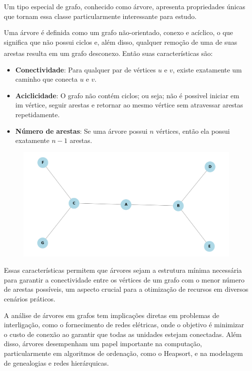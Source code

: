 \documentclass[12pt, a4paper]{scrreprt}
\begin{document}
Um tipo especial de grafo, conhecido como árvore, apresenta propriedades únicas que tornam essa classe particularmente interessante para estudo.

Uma árvore é definida como um grafo não-orientado, conexo e acíclico, o que significa que não possui ciclos e, além disso, qualquer remoção de uma de suas arestas resulta em um grafo desconexo.\textsuperscript{\cite{definicaoarvore} \cite{emilio2024arvores}} Então suas características são:

\begin{itemize}
        \item \textbf{Conectividade}: Para qualquer par de vértices \( u \) e \( v \), existe exatamente um caminho que conecta \( u \) e \( v \).
        \item \textbf{Aciclicidade}: O grafo não contém ciclos; ou seja; não é possivel iniciar em im vértice, seguir arestas e retornar ao mesmo vértice sem atravessar arestas repetidamente.
        \item \textbf{Número de arestas}: Se uma árvore possui \( n \) vértices, então ela possui exatamente \( n - 1 \) arestas.
\end{itemize}

\begin{figure}[h]
    \centering
    \includegraphics[width=.65\textwidth]{src/arvore_exemplo.png}
    \label{fig:exemplo de árvore}
\end{figure}

Essas características permitem que árvores sejam a estrutura mínima necessária para garantir a conectividade entre os vértices de um grafo com o menor número de arestas possíveis, um aspecto crucial para a otimização de recursos em diversos cenários práticos.

A análise de árvores em grafos tem implicações diretas em problemas de interligação, como o fornecimento de redes elétricas, onde o objetivo é minimizar o custo de conexão ao garantir que todas as unidades estejam conectadas. Além disso, árvores desempenham um papel importante na computação, particularmente em algoritmos de ordenação, como o Heapsort, e na modelagem de genealogias e redes hierárquicas.
\end{document}
